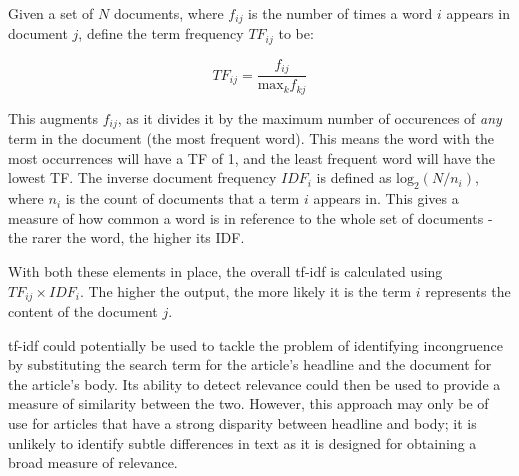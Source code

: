 Given a set of \(N\) documents, where \(f_{ij}\) is the number of times a word \(i\) appears in document \(j\), \citeauthor{Rajaraman2011} define the term frequency \(TF_{ij}\) to be:

\[TF_{ij} = \frac{f_{ij}}{\textrm{max}_k f_{kj}}\]

This augments \(f_{ij}\), as it divides it by the maximum number of occurences of \textit{any} term in the document (the most frequent word). This means the word with the most occurrences will have a TF of 1, and the least frequent word will have the lowest TF. The inverse document frequency \(IDF_i\) is defined as \(\textrm{log}_2(N/n_i)\), where \(n_i\) is the count of documents that a term \(i\) appears in. This gives a measure of how common a word is in reference to the whole set of documents - the rarer the word, the higher its IDF.

With both these elements in place, the overall tf-idf is calculated using \(TF_{ij} \times IDF_i\). The higher the output, the more likely it is the term \(i\) represents the content of the document \(j\).

tf-idf could potentially be used to tackle the problem of identifying incongruence by substituting the search term for the article's headline and the document for the article's body. Its ability to detect relevance could then be used to provide a measure of similarity between the two. However, this approach may only be of use for articles that have a strong disparity between headline and body; it is unlikely to identify subtle differences in text as it is designed for obtaining a broad measure of relevance.